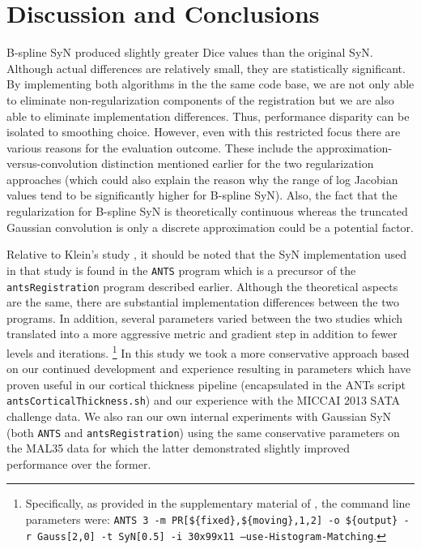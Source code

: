 \documentclass{frontiersSCNS}
\begin{document}
\section{Discussion and Conclusions}

B-spline SyN produced slightly greater Dice values than the original SyN. 
Although actual differences are relatively small, they are statistically 
significant. By implementing both algorithms in the the same code base, 
we are not only able to eliminate non-regularization components of the 
registration but we are also able to eliminate implementation differences. 
Thus, performance disparity can be isolated to smoothing choice. However, 
even with this restricted focus there are various reasons for the evaluation 
outcome. These include the approximation-versus-convolution distinction 
mentioned earlier for the two regularization approaches (which could also 
explain the reason why the range of log Jacobian values tend to be significantly 
higher for B-spline SyN). Also, the fact that the regularization for 
B-spline SyN is theoretically continuous whereas the truncated Gaussian 
convolution is only a discrete approximation could be a potential factor. 

Relative to Klein's study \citep{klein2009}, it should be noted that 
the SyN implementation used in that study is found in the {\tt ANTS} 
program which is a precursor of the {\tt antsRegistration} program
described earlier.  Although the theoretical aspects 
are the same, there are substantial implementation differences between 
the two programs.  In addition, several parameters varied between the two
studies which translated into a more aggressive metric and 
gradient step in addition to fewer levels and iterations.%
\footnote{
Specifically, as provided in the supplementary material of \cite{klein2009},
the command line parameters were:
{\tt ANTS 3 -m PR[\$\{fixed\},\$\{moving\},1,2] -o \$\{output\} -r Gauss[2,0] 
-t SyN[0.5] -i 30x99x11 --use-Histogram-Matching}.  
}
In this study we took a more conservative approach based on our 
continued development and experience resulting in parameters which have proven
useful in our cortical thickness pipeline (encapsulated in 
the ANTs script {\tt antsCorticalThickness.sh}) and our
experience with the MICCAI 2013 SATA challenge data.  We also 
ran our own internal experiments with Gaussian SyN (both {\tt ANTS} and 
{\tt antsRegistration}) using the same conservative parameters 
on the MAL35 data for which the latter demonstrated slightly improved
performance over the former.
\end{document}
